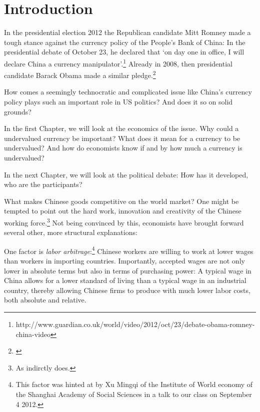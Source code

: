\section{Introduction}

In the presidential election 2012 the Republican candidate Mitt Romney made a tough stance against the currency policy of the People's Bank of China: In the presidential debate of October 23, he declared that `on day one in office, I will declare China a currency manipulator'.\footnote{http://www.guardian.co.uk/world/video/2012/oct/23/debate-obama-romney-china-video}%
Already in 2008, then presidential candidate Barack Obama made a similar pledge.\footnote{\cite{Obama2008}}

How comes a seemingly technocratic and complicated issue like China's currency policy plays such an important role in US politics? And does it so on solid grounds?

In the first Chapter, we will look at the economics of the issue. Why could a undervalued currency be important? What does it mean for a currency to be undervalued? And how do economists know if and by how much a currency is undervalued?

In the next Chapter, we will look at the political debate: How has it developed, who are the participants?




What makes Chinese goods competitive on the world market? One might be 
tempted to point out the hard work, innovation and creativity of the 
Chinese working force.\footnote{As \cite[p. 18]{Yu2010} indirctly does.} 
Not being convinced by this, economists have brought forward several 
other, more structural explanations:

One factor is \emph{labor arbitrage}:\footnote{This factor was hinted at 
by Xu Mingqi of the Institute of World economy of the Shanghai Academy 
of Social Sciences in a talk to our class on September 4 2012.} Chinese 
workers are willing to work at lower wages than workers in importing 
countries. Importantly, accepted wages are not only lower in absolute 
terms but also in terms of purchasing power: A typical wage in China 
allows for a lower standard of living than a typical wage in an 
industrial country, thereby allowing Chinese firms to produce with much 
lower labor costs, both absolute and relative. 

